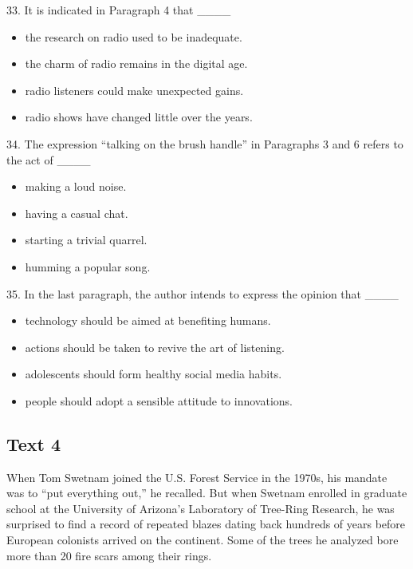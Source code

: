 \documentclass[UTF8,11pt]{ctexart}
\begin{document}
33. It is indicated in Paragraph 4 that \_\_\_\_


\begin{itemize}[leftmargin=2em,itemsep=.2em,topsep=.4em]\item[A.] the research on radio used to be inadequate.
\item[B.] the charm of radio remains in the digital age.
\item[C.] radio listeners could make unexpected gains.
\item[D.] radio shows have changed little over the years.
\end{itemize}

34. The expression “talking on the brush handle” in Paragraphs 3 and 6 refers to the act of \_\_\_\_


\begin{itemize}[leftmargin=2em,itemsep=.2em,topsep=.4em]\item[A.] making a loud noise.
\item[B.] having a casual chat.
\item[C.] starting a trivial quarrel.
\item[D.] humming a popular song.
\end{itemize}

35. In the last paragraph, the author intends to express the opinion that \_\_\_\_


\begin{itemize}[leftmargin=2em,itemsep=.2em,topsep=.4em]\item[A.] technology should be aimed at benefiting humans.
\item[B.] actions should be taken to revive the art of listening.
\item[C.] adolescents should form healthy social media habits.
\item[D.] people should adopt a sensible attitude to innovations.
\end{itemize}

\subsection*{\textbf{Text 4}}


When Tom Swetnam joined the U.S. Forest Service in the 1970s, his mandate was to “put everything out,” he recalled. But when Swetnam enrolled in graduate school at the University of Arizona’s Laboratory of Tree-Ring Research, he was surprised to find a record of repeated blazes dating back hundreds of years before European colonists arrived on the continent. Some of the trees he analyzed bore more than 20 fire scars among their rings.
\end{document}
